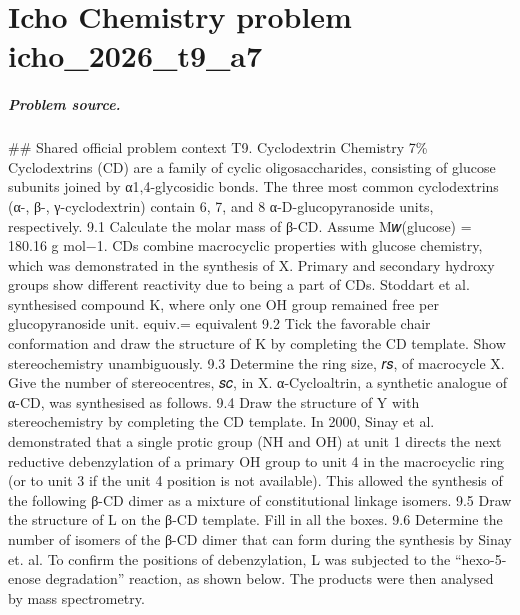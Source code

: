 
\chapter{Icho Chemistry problem icho\_2026\_t9\_a7}
\label{ch:IChO2026Problems_problem_icho_2026_t9_a7}

\paragraph{Problem source.}
\#\# Shared official problem context
T9. Cyclodextrin Chemistry 7\% Cyclodextrins (CD) are a family of cyclic oligosaccharides, consisting of glucose subunits joined by α1,4-glycosidic bonds. The three most common cyclodextrins (α-, β-, γ-cyclodextrin) contain 6, 7, and 8 α-D-glucopyranoside units, respectively. 9.1 Calculate the molar mass of β-CD. Assume M𝑤(glucose) = 180.16 g mol−1. CDs combine macrocyclic properties with glucose chemistry, which was demonstrated in the synthesis of X. Primary and secondary hydroxy groups show different reactivity due to being a part of CDs. Stoddart et al. synthesised compound K, where only one OH group remained free per glucopyranoside unit. equiv.= equivalent 9.2 Tick the favorable chair conformation and draw the structure of K by completing the CD template. Show stereochemistry unambiguously. 9.3 Determine the ring size, 𝑟𝑠, of macrocycle X. Give the number of stereocentres, 𝑠𝑐, in X. α-Cycloaltrin, a synthetic analogue of α-CD, was synthesised as follows. 9.4 Draw the structure of Y with stereochemistry by completing the CD template. In 2000, Sinay et al. demonstrated that a single protic group (NH and OH) at unit 1 directs the next reductive debenzylation of a primary OH group to unit 4 in the macrocyclic ring (or to unit 3 if the unit 4 position is not available). This allowed the synthesis of the following β-CD dimer as a mixture of constitutional linkage isomers. 9.5 Draw the structure of L on the β-CD template. Fill in all the boxes. 9.6 Determine the number of isomers of the β-CD dimer that can form during the synthesis by Sinay et. al. To confirm the positions of debenzylation, L was subjected to the “hexo-5-enose degradation” reaction, as shown below. The products were then analysed by mass spectrometry.


